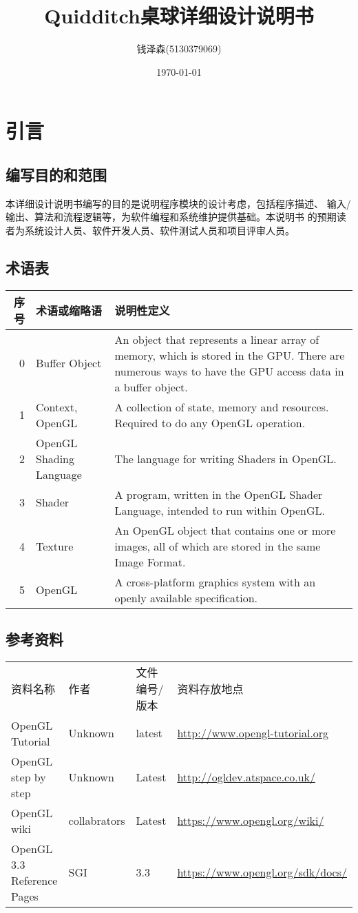 \documentclass[11pt]{article}
\author{钱泽森(5130379069)}
\date{\today}
\title{Quidditch桌球详细设计说明书}
\begin{document}
\maketitle
\tableofcontents


\section*{引言}
\label{sec-1}
\subsection*{编写目的和范围}
\label{sec-1-1}
本详细设计说明书编写的目的是说明程序模块的设计考虑，包括程序描述、
输入/输出、算法和流程逻辑等，为软件编程和系统维护提供基础。本说明书
的预期读者为系统设计人员、软件开发人员、软件测试人员和项目评审人员。
\subsection*{术语表}
\label{sec-1-2}
\begin{center}
\begin{tabular}{rll}
序号 & 术语或缩略语 & 说明性定义\\
\hline
0 & Buffer Object & An object that represents a linear array of memory, which is stored in the GPU. There are numerous ways to have the GPU access data in a buffer object.\\
1 & Context, OpenGL & A collection of state, memory and resources. Required to do any OpenGL operation.\\
2 & OpenGL Shading Language & The language for writing Shaders in OpenGL.\\
3 & Shader & A program, written in the OpenGL Shader Language, intended to run within OpenGL.\\
4 & Texture & An OpenGL object that contains one or more images, all of which are stored in the same Image Format.\\
5 & OpenGL & A cross-platform graphics system with an openly available specification.\\
\end{tabular}
\end{center}

\subsection*{参考资料}
\label{sec-1-3}
\begin{center}
\begin{tabular}{llll}
资料名称 & 作者 & 文件编号/版本 & 资料存放地点\\
OpenGL Tutorial & Unknown & latest & \url{http://www.opengl-tutorial.org}\\
OpenGL step by step & Unknown & Latest & \url{http://ogldev.atspace.co.uk/}\\
OpenGL wiki & collabrators & Latest & \url{https://www.opengl.org/wiki/}\\
OpenGL 3.3 Reference Pages & SGI & 3.3 & \url{https://www.opengl.org/sdk/docs/}\\
\end{tabular}
\end{center}
\end{document}

